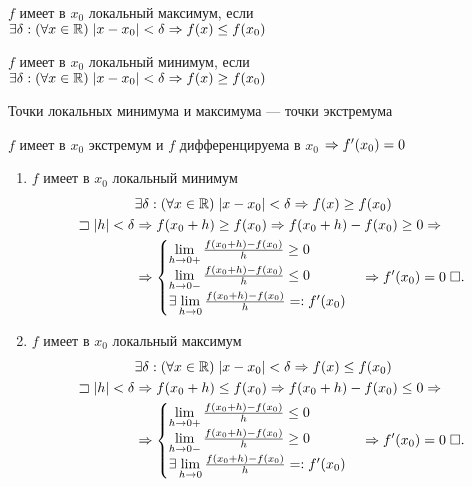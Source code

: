 \documentclass{article}
\begin{document}


$f$ имеет в $x_0$ локальный максимум, если $\exists\delta:(\forall x\in\mathbb{R})\;|x-x_0|<\delta\Rightarrow f(x)\leq f(x_0)$

$f$ имеет в $x_0$ локальный минимум, если $\exists\delta:(\forall x\in\mathbb{R})\;|x-x_0|<\delta\Rightarrow f(x)\geq f(x_0)$

Точки локальных минимума и максимума --- точки экстремума

\theorem

$f$ имеет в $x_0$ экстремум и $f$ дифференцируема в $x_0$ $\Rightarrow f'(x_0)=0$

\proof
\begin{enumerate}
	\item$f$ имеет в $x_0$ локальный минимум
	\begin{align*}
		 & \exists\delta: (\forall x\in\mathbb{R})\;|x-x_0|<\delta\Rightarrow f(x)\geq f(x_0) \\
		\sqsupset |h| < \delta
		 & \Rightarrow f(x_0+h)\geq f(x_0) \Rightarrow f(x_0+h)-f(x_0) \geq 0\Rightarrow          \\
		 & \Rightarrow\begin{cases}
			        \lim\limits_{h\to0+}\frac{f(x_0+h)-f(x_0)}{h}\geq0 \\
			        \lim\limits_{h\to0-}\frac{f(x_0+h)-f(x_0)}{h}\leq0 \\
			        \exists\lim\limits_{h\to0}\frac{f(x_0+h)-f(x_0)}{h}=:f'(x_0)
		        \end{cases} \Rightarrow f'(x_0)=0\;\square.
	\end{align*}
	\item$f$ имеет в $x_0$ локальный максимум
	\begin{align*}
		 & \exists\delta: (\forall x\in\mathbb{R})\;|x-x_0|<\delta\Rightarrow f(x)\leq f(x_0) \\
		\sqsupset |h| < \delta
		 & \Rightarrow f(x_0+h)\leq f(x_0) \Rightarrow f(x_0+h)-f(x_0) \leq 0\Rightarrow          \\
		 & \Rightarrow\begin{cases}
			        \lim\limits_{h\to0+}\frac{f(x_0+h)-f(x_0)}{h}\leq0 \\
			        \lim\limits_{h\to0-}\frac{f(x_0+h)-f(x_0)}{h}\geq0 \\
			        \exists\lim\limits_{h\to0}\frac{f(x_0+h)-f(x_0)}{h}=:f'(x_0)
		        \end{cases} \Rightarrow f'(x_0)=0\;\square.
	\end{align*}
\end{enumerate}
\end{document}
